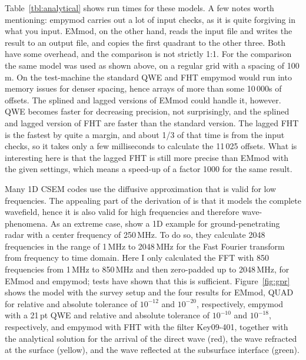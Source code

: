 \documentclass[paper]{geophysics}
\begin{document}
Table~\ref{tbl:analytical} shows run times for these models. A few notes worth
mentioning: empymod carries out a lot of input checks, as it is quite forgiving
in what you input. EMmod, on the other hand, reads the input file and writes
the result to an output file, and copies the first quadrant to the other three.
Both have  some overhead, and the comparison is not
strictly 1:1. For the comparison the same model was used as shown above, on a
regular grid with a spacing of 100\,m. On the test-machine the standard QWE and
FHT empymod would run into memory issues for denser spacing, hence arrays of
more than some 10\,000s of offsets. The splined and lagged versions of EMmod
could handle it, however.
%
%
QWE becomes faster for decreasing precision, not surprisingly, and the splined
and lagged version of FHT are faster than the standard version. The lagged FHT
is the fastest by quite a margin, and about 1/3 of that time is from the input
checks, so it takes only a few milliseconds to calculate the 11\,025 offsets.
What is interesting here is that the lagged FHT is still more precise than
EMmod with the given settings, which means a speed-up of a factor 1000 for the
same result.

Many 1D CSEM codes use the diffusive approximation that is valid for low
frequencies. The appealing part of the derivation of \cite{GEO.15.Hunziker} is
that it models the complete wavefield, hence it is also valid for high
frequencies and therefore wave-phenomena. As an extreme case,
\cite{GEO.15.Hunziker} show a 1D example for ground-penetrating radar with a
center frequency of 250\,MHz. To do so, they calculate 2048 frequencies in the
range of 1\,MHz to 2048\,MHz for the Fast Fourier transform from frequency to
time domain. Here I only calculated the FFT with 850 frequencies from 1\,MHz
to 850\,MHz and then zero-padded up to 2048\,MHz, for EMmod and empymod; tests
have shown that this is sufficient. Figure~\ref{fig:gpr} shows the model with
the survey setup and the four results for EMmod, QUAD for
relative and absolute tolerance of $10^{-12}$ and $10^{-20}$, respectively,
empymod with a 21\,pt QWE and relative and absolute tolerance of $10^{-10}$ and
$10^{-18}$, respectively, and empymod with FHT with the filter Key09-401,
together with the analytical solution for the arrival of the direct wave (red),
the wave refracted at the surface (yellow), and the wave reflected at the
subsurface interface (green).
\end{document}
